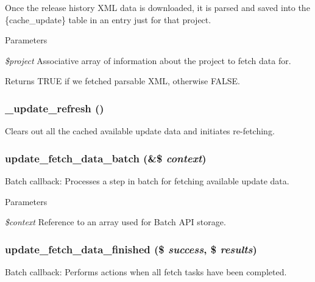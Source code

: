 Once the release history XML data is downloaded, it is parsed and saved into the \{cache\_\-update\} table in an entry just for that project.


\begin{DoxyParams}{Parameters}
\item[{\em \$project}]Associative array of information about the project to fetch data for.\end{DoxyParams}
\begin{DoxyReturn}{Returns}
TRUE if we fetched parsable XML, otherwise FALSE. 
\end{DoxyReturn}
\hypertarget{update_8fetch_8inc_aa9814236d331f2e6822435215e9acd8e}{
\subsubsection[{\_\-update\_\-refresh}]{\setlength{\rightskip}{0pt plus 5cm}\_\-update\_\-refresh ()}}
\label{update_8fetch_8inc_aa9814236d331f2e6822435215e9acd8e}
Clears out all the cached available update data and initiates re-\/fetching. \hypertarget{update_8fetch_8inc_a7975896014a8fc9b4e14306a875b97f2}{
\subsubsection[{update\_\-fetch\_\-data\_\-batch}]{\setlength{\rightskip}{0pt plus 5cm}update\_\-fetch\_\-data\_\-batch (\&\$ {\em context})}}
\label{update_8fetch_8inc_a7975896014a8fc9b4e14306a875b97f2}
Batch callback: Processes a step in batch for fetching available update data.


\begin{DoxyParams}{Parameters}
\item[{\em \$context}]Reference to an array used for Batch API storage. \end{DoxyParams}
\hypertarget{update_8fetch_8inc_ac901625f220862b797fb5c5cc4dcb654}{
\subsubsection[{update\_\-fetch\_\-data\_\-finished}]{\setlength{\rightskip}{0pt plus 5cm}update\_\-fetch\_\-data\_\-finished (\$ {\em success}, \/  \$ {\em results})}}
\label{update_8fetch_8inc_ac901625f220862b797fb5c5cc4dcb654}
Batch callback: Performs actions when all fetch tasks have been completed.


